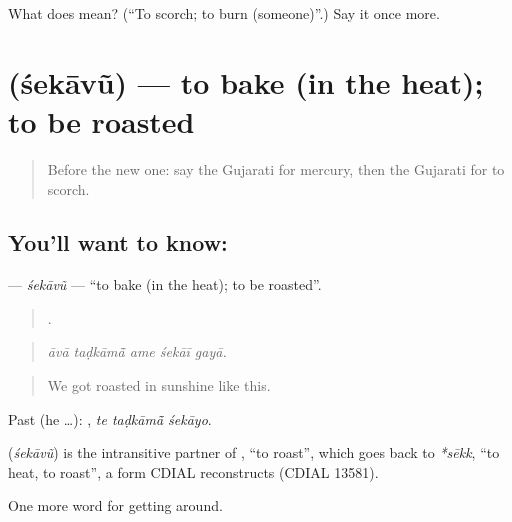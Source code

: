 \begin{tcolorbox}[breakable,colback=teal!4,colframe=teal!35!black,title={Before you move on}]
What does  mean? (\textquotedblleft{}To scorch; to burn (someone)\textquotedblright{}.) Say it once more.
\end{tcolorbox}
\section[\texorpdfstring{\gu{શેકાવું} (śekāvũ)}{શેકાવું (śekāvũ)}]{ (śekāvũ) — to bake (in the heat); to be roasted}

\label{lesson:GU-C436-sekavu}



\begin{quote}
Before the new one: say the Gujarati for mercury, then the Gujarati for to scorch.
\end{quote}

\subsection*{You'll want to know: }
\textbf{} — \emph{śekāvũ} — \textquotedblleft{}to bake (in the heat); to be roasted\textquotedblright{}.

\begin{quote}
    .
\end{quote}

\begin{quote}
\emph{āvā taḍkāmā̃ ame śekāī gayā.}
\end{quote}

\begin{quote}
We got roasted in sunshine like this.
\end{quote}

Past (he …):   , \emph{te taḍkāmā̃ śekāyo}.

\begin{cousinweb}
\textbf{} (\emph{śekāvũ}) is the intransitive partner of , \textquotedblleft{}to roast\textquotedblright{}, which goes back to \emph{*sēkk}, \textquotedblleft{}to heat, to roast\textquotedblright{}, a form CDIAL reconstructs (CDIAL 13581).
\end{cousinweb}

\begin{grammarlens}[title={What you've built}]
One more word for getting around.
\end{grammarlens}

